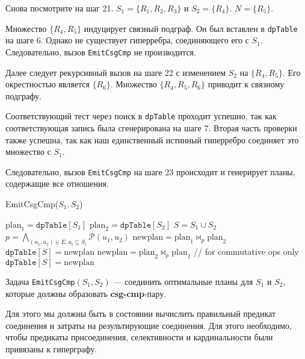 \documentclass[12pt]{article}
\begin{document}
\begin{flushleft}
Снова посмотрите на шаг 21.  
$S_1 = \{R_1, R_2, R_3\}$ и $S_2 = \{R_4\}$.  
$N = \{R_5\}$.  

Множество $\{R_4, R_5\}$ индуцирует связный подграф.  
Он был вставлен в \texttt{dpTable} на шаге 6.  
Однако не существует гиперребра, соединяющего его с $S_1$.  
Следовательно, вызов \texttt{EmitCsgCmp} не производится.  

Далее следует рекурсивный вызов на шаге 22  
с изменением $S_2$ на $\{R_4, R_5\}$.  
Его окрестностью является $\{R_6\}$.  
Множество $\{R_4, R_5, R_6\}$ приводит к связному подграфу.  

Соответствующий тест через поиск в \texttt{dpTable} проходит успешно,  
так как соответствующая запись была сгенерирована на шаге 7.  
Вторая часть проверки также успешна,  
так как наш единственный истинный гиперребро соединяет это множество с $S_1$.  

Следовательно, вызов \texttt{EmitCsgCmp} на шаге 23 происходит  
и генерирует планы, содержащие все отношения.  

\begin{algorithm}
    EmitCsgCmp($S_1, S_2$)
    \begin{algorithmic}[1]
            \State $\text{plan}_1 = \texttt{dpTable}[S_1]$
            \State $\text{plan}_2 = \texttt{dpTable}[S_2]$
            \State $S = S_1 \cup S_2$
            \State $p = \bigwedge_{(u_1, u_2) \in E, u_i \subseteq S_i} \mathcal{P}(u_1, u_2)$
            \State $\text{newplan} = \text{plan}_1 \Join_p \text{plan}_2$
                \State $\texttt{dpTable}[S] = \text{newplan}$
            \EndIf
            \State $\text{newplan} = \text{plan}_2 \Join_p \text{plan}_1$ \quad // for commutative ops only
                \State $\texttt{dpTable}[S] = \text{newplan}$
            \EndIf
    \end{algorithmic}
\end{algorithm}

Задача \texttt{EmitCsgCmp}$(S_1, S_2)$ — соединить оптимальные планы  
для $S_1$ и $S_2$, которые должны образовать \textbf{csg-cmp}-пару.  

Для этого мы должны быть в состоянии вычислить  
правильный предикат соединения и затраты на результирующие соединения.  
Для этого необходимо, чтобы предикаты присоединения,  
селективности и кардинальности были привязаны к гиперграфу.  


\end{flushleft}
\end{document}
